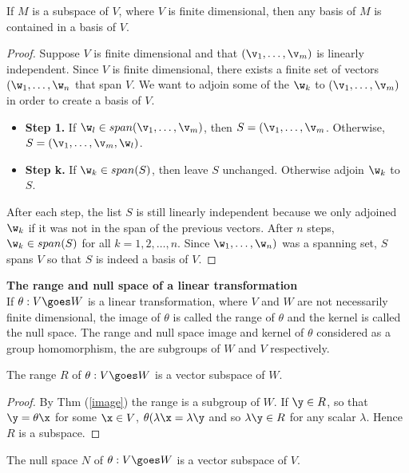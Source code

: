\begin{theorem}
If $M$ is a subspace of $V$, where $V$ is finite dimensional, then any basis of $M$ is contained in a basis of $V$. 
\end{theorem}
\begin{proof}
Suppose $V$ is finite dimensional and that $(\v_1, \hdots, \v_m)$ is linearly independent. Since $V$ is finite dimensional, there exists a finite set of vectors $(\w_1,\hdots,\w_n$ that span $V$. We want to adjoin some of the 
$\w_k$ to $(\v_1, \hdots, \v_m)$ in order to create a basis of $V$.
\begin{itemize}
\item[]{\bf Step 1.} If $\w_l \in span(\v_1, \hdots, \v_m)$, then $S = (\v_1, \hdots, \v_m$. Otherwise, $S = (\v_1, \hdots, \v_m, \w_l)$.
\item[]{\bf Step k.} If $\w_k \in span(S)$, then leave $S$ unchanged. Otherwise adjoin $\w_k$ to $S$. 
\end{itemize}
After each step, the list $S$ is still linearly independent because we only adjoined $\w_k$ if it was not in the span of the previous vectors. After $n$ steps, $\w_k\in span(S)$ for all $k = 1, 2, \hdots, n$. Since $\w_1, \hdots, \w_n)$  was a spanning set, $S$ spans $V$ so that $S$ is indeed a basis of $V$. 
\end{proof}

{\bf The range and null space of a linear transformation}\\

If $\theta: V \goes W$ is a linear transformation, where $V$ and $W$ are not necessarily finite dimensional, the image of $\theta$ is called the {\twelveit range} of $\theta$ and the kernel is called the {\twelveit null space}. The range and null space image and kernel of $\theta$ considered as a group homomorphism, the are subgroups of $W$ and $V$ respectively. 

\begin{theorem}
The range $R$ of $\theta: V \goes W$ is a vector subspace of $W$. 
\end{theorem}

\begin{proof}
By Thm (\ref{image}) the range is a subgroup of $W$. If $\y \in R$, so that $ \y = \theta \x$ for some $\x \in V$, $\theta(\lambda \x = \lambda \y$ and so $\lambda \y \in R$ for any scalar $\lambda$. Hence $R$ is a subspace. 
\end{proof}

\begin{theorem}
The null space $N$ of $\theta: V \goes W$ is a vector subspace of $V$. 
\end{theorem}

